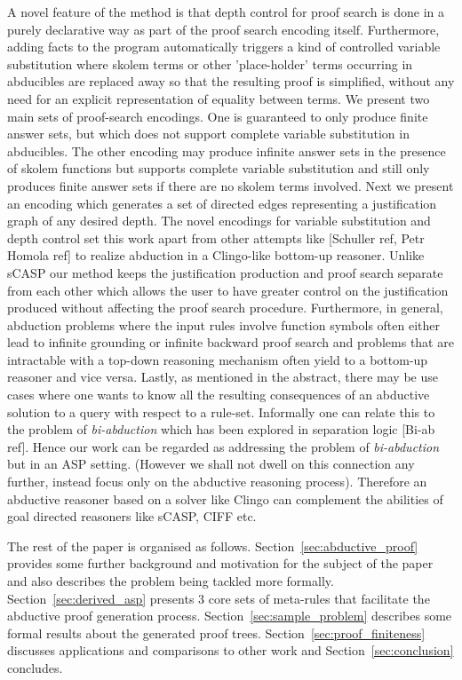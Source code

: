 \documentclass[sigconf]{acmart}
\begin{document}
A novel feature of the method is that depth control for proof search is done
in a purely declarative way as part of the proof search encoding
itself. Furthermore, adding facts to the program automatically triggers a kind
of controlled variable substitution where skolem terms or
other 'place-holder' terms occurring in abducibles are replaced away so that
the resulting proof is simplified, without any need for an explicit
representation of equality between terms. We present two main sets of
proof-search encodings. One is guaranteed to only produce finite answer sets,
but which does not support complete variable substitution in abducibles. The
other encoding may produce infinite answer sets in the presence of skolem
functions but supports complete variable substitution and still only produces
finite answer sets if there are no skolem terms involved. Next we present an
encoding which generates a set of directed edges representing a justification
graph of any desired depth. The novel encodings for variable substitution and depth
control set this work apart from other attempts like [Schuller ref, Petr
Homola ref] to realize abduction in a Clingo-like bottom-up reasoner. Unlike
sCASP our method keeps the justification production and proof search separate
from each other which allows the user to have greater control on the
justification produced without affecting the proof search
procedure. Furthermore, in general, abduction problems where the input rules
involve function symbols often either lead to infinite grounding or infinite
backward proof search and problems that are intractable with a top-down
reasoning mechanism often yield to a bottom-up reasoner and vice
versa. Lastly, as
mentioned in the abstract, there may be use cases where one wants to know all
the resulting consequences of an abductive solution to a query with respect to
a rule-set. Informally one can relate this to the problem of
\emph{bi-abduction} which has been explored in separation logic [Bi-ab
ref]. Hence our work can be regarded as addressing the problem of
\emph{bi-abduction} but in an ASP setting. (However we shall not dwell on this
connection any further, instead focus only on the abductive reasoning
process). Therefore an abductive reasoner based on a solver like Clingo can
complement the abilities of goal directed reasoners like sCASP, CIFF etc.

The rest of the paper is organised as follows. Section~\ref{sec:abductive_proof} provides some further background and motivation for the subject of the paper and also describes the problem being tackled more formally. Section~\ref{sec:derived_asp} presents 3 core sets of meta-rules that facilitate the abductive proof generation process. Section~\ref{sec:sample_problem} describes some formal results about the generated proof trees. Section~\ref{sec:proof_finiteness} discusses applications and comparisons to other work and Section~\ref{sec:conclusion} concludes.
\end{document}
